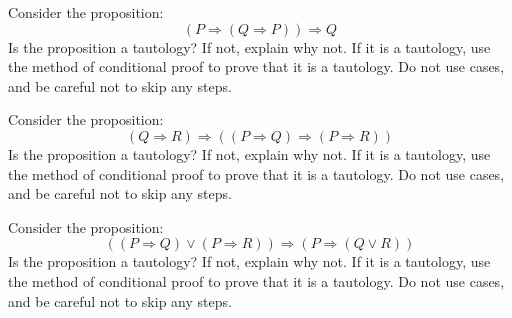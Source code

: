 \documentclass[12pt]{midterm}
\begin{document}
\begin{exam}
\begin{solution}\begin{solutiontext}
\end{solutiontext}\end{solution}

\begin{problem}[360]
  Consider the proposition:
  $$
  \left( P \Rightarrow (Q \Rightarrow P) \right) \Rightarrow Q
  $$
  Is the proposition a tautology?  If not, explain why not.  If it is
  a tautology, use the method of conditional proof to prove that it is
  a tautology.  Do not use cases, and be careful not to skip any
  steps.
\end{problem}

\begin{solution}\begin{solutiontext}
\end{solutiontext}\end{solution}

\begin{problem}[360]
  Consider the proposition:
  $$
  \left(Q \Rightarrow R\right) \Rightarrow \left( (P \Rightarrow Q) \Rightarrow (P \Rightarrow R) \right)
  $$
  Is the proposition a tautology?  If not, explain why not.  If it is
  a tautology, use the method of conditional proof to prove that it is
  a tautology.  Do not use cases, and be careful not to skip any
  steps.
\end{problem}

\begin{solution}\begin{solutiontext}
\end{solutiontext}\end{solution}


\begin{problem}[360]
  Consider the proposition:
  $$
  \left( (P \Rightarrow Q) \vee (P \Rightarrow R) \right) \Rightarrow \left(P \Rightarrow \left(Q \vee R\right) \right)
  $$
  Is the proposition a tautology?  If not, explain why not.  If it is
  a tautology, use the method of conditional proof to prove that it is
  a tautology.  Do not use cases, and be careful not to skip any
  steps.
\end{problem}

\begin{solution}\begin{solutiontext}
\end{solutiontext}\end{solution}


\end{exam}
\end{document}
